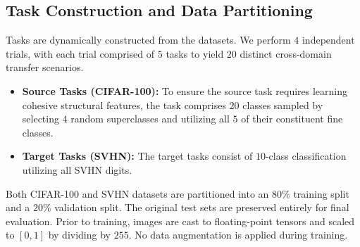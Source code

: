 \documentclass[11pt, a4paper, copyright, gdm]{google}
\theoremstyle{definition}
\begin{document}
\subsection{Task Construction and Data Partitioning}
Tasks are dynamically constructed from the datasets. We perform $4$ independent trials, with each trial comprised of $5$ tasks to yield $20$ distinct cross-domain transfer scenarios.
\begin{itemize}
    \item \textbf{Source Tasks (CIFAR-100):} To ensure the source task requires learning cohesive structural features, the task comprises $20$ classes sampled by selecting $4$ random superclasses and utilizing all $5$ of their constituent fine classes.
    \item \textbf{Target Tasks (SVHN):} The target tasks consist of $10$-class classification utilizing all SVHN digits.
\end{itemize}
Both CIFAR-100 and SVHN datasets are partitioned into an $80\%$ training split and a $20\%$ validation split. The original test sets are preserved entirely for final evaluation. Prior to training, images are cast to floating-point tensors and scaled to $[0,1]$ by dividing by $255$. No data augmentation is applied during training.
\end{document}
